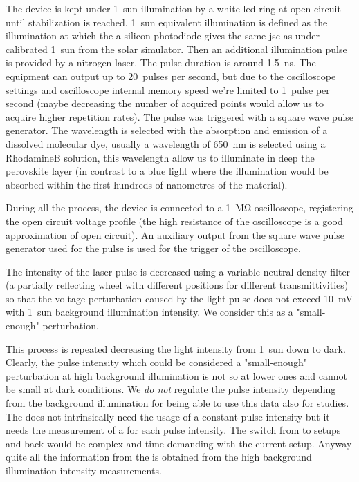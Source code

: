 The device is kept under 1~sun illumination by a white \gls{led} ring at open circuit until stabilization is reached. 1~sun equivalent illumination is defined as the illumination at which the a silicon photodiode gives the same \gls{jsc} as under calibrated 1~sun from the solar simulator. Then an additional illumination pulse is provided by a nitrogen laser. The pulse duration is around \SI{1.5}{\ns}. The equipment can output up to 20~pulses per second, but due to the oscilloscope settings and oscilloscope internal memory speed we're limited to 1~pulse per second (maybe decreasing the number of acquired points would allow us to acquire higher repetition rates). The pulse was triggered with a square wave pulse generator. The wavelength is selected with the absorption and emission of a dissolved molecular dye, usually a wavelength of \SI{650}{\nm} is selected using a RhodamineB solution\cite{RadiantDyesLaser}, this wavelength allow us to illuminate in deep the perovskite layer (in contrast to a blue light where the illumination would be absorbed within the first hundreds of nanometres of the material).

During all the process, the device is connected to a \SI{1}{\Mohm} oscilloscope, registering the open circuit voltage profile (the high resistance of the oscilloscope is a good approximation of open circuit). An auxiliary output from the square wave pulse generator used for the pulse is used for the trigger of the oscilloscope.

The intensity of the laser pulse is decreased using a variable neutral density filter (a partially reflecting wheel with different positions for different transmittivities) so that the voltage perturbation caused by the light pulse does not exceed \SI{10}{\mV} with 1~sun background illumination intensity. We consider this as a "small-enough" perturbation.

This process is repeated decreasing the light intensity from 1~sun down to dark. Clearly, the pulse intensity which could be considered a "small-enough" perturbation at high background illumination is not so at lower ones and cannot be small at dark conditions. We \emph{do not} regulate the pulse intensity depending from the background illumination for being able to use this data also for  studies. The  does not intrinsically need the usage of a constant pulse intensity but it needs the measurement of a  for each pulse intensity. The switch from  to  setups and back would be complex and time demanding with the current setup. Anyway quite all the information from the  is obtained from the high background illumination intensity measurements.


